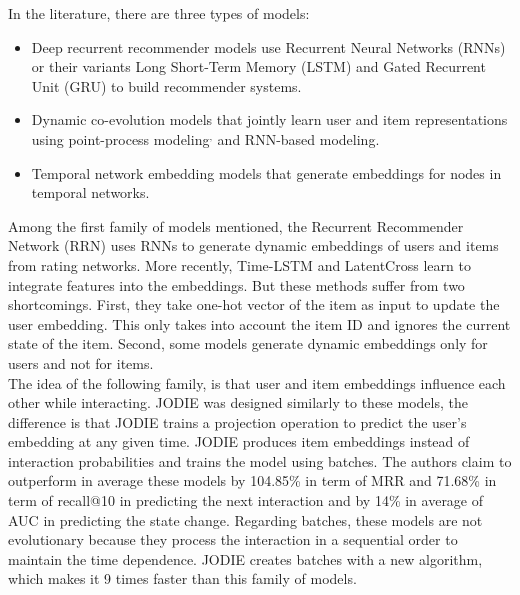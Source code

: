 In the literature, there are three types of models:
\begin{itemize}
    \item Deep recurrent recommender models use Recurrent Neural Networks\supercite{Rumelhart1986} (RNNs) or their variants Long Short-Term Memory\supercite{LSTM} (LSTM) and Gated Recurrent Unit\supercite{https://doi.org/10.48550/arxiv.1406.1078GRU} (GRU) to build recommender systems.
    \item Dynamic co-evolution models that jointly learn user and item representations using point-process modeling\supercite{https://doi.org/10.48550/arxiv.1705.05742}$^,$\supercite{NIPS2016_53ed35c7} and RNN-based modeling\supercite{https://doi.org/10.48550/arxiv.1609.03675}.
    \item Temporal network embedding models that generate embeddings for nodes in temporal networks.
\end{itemize}

Among the first family of models mentioned, the Recurrent Recommender Network\supercite{10.1145/3018661.3018689} (RRN) uses RNNs to generate dynamic embeddings of users and items from rating networks. More recently, Time-LSTM\supercite{ijcai2017-504} and LatentCross\supercite{46488} learn to integrate features into the embeddings. But these methods suffer from two shortcomings. First, they take one-hot vector of the item as input to update the user embedding. This only takes into account the item ID and ignores the current state of the item. Second, some models generate dynamic embeddings only for users and not for items.\\

The idea of the following family, is that user and item embeddings influence each other while interacting. JODIE was designed similarly to these models, the difference is that JODIE trains a projection operation to predict the user's embedding at any given time. JODIE produces item embeddings instead of interaction probabilities and trains the model using batches. The authors claim to outperform in average these models by 104.85\% in term of MRR and 71.68\% in term of recall@10 in predicting the next interaction and by 14\% in average of AUC in predicting the state change. Regarding batches, these models are not evolutionary because they process the interaction in a sequential order to maintain the time dependence. JODIE creates batches with a new algorithm, which makes it 9 times faster than this family of models.\\

